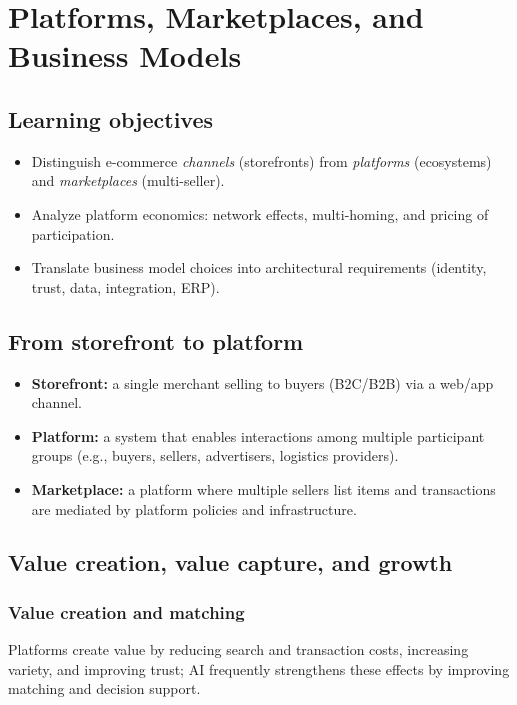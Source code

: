 \chapter{Platforms, Marketplaces, and Business Models}

\section{Learning objectives}
\begin{itemize}
  \item Distinguish e-commerce \emph{channels} (storefronts) from \emph{platforms} (ecosystems) and \emph{marketplaces} (multi-seller).
  \item Analyze platform economics: network effects, multi-homing, and pricing of participation.
  \item Translate business model choices into architectural requirements (identity, trust, data, integration, ERP).
\end{itemize}

\section{From storefront to platform}
\begin{itemize}
  \item \textbf{Storefront:} a single merchant selling to buyers (B2C/B2B) via a web/app channel.
  \item \textbf{Platform:} a system that enables interactions among multiple participant groups (e.g., buyers, sellers, advertisers, logistics providers).
  \item \textbf{Marketplace:} a platform where multiple sellers list items and transactions are mediated by platform policies and infrastructure.
\end{itemize}

\section{Value creation, value capture, and growth}
\subsection{Value creation and matching}
Platforms create value by reducing search and transaction costs, increasing variety, and improving trust; AI frequently strengthens these effects by improving matching and decision support.

